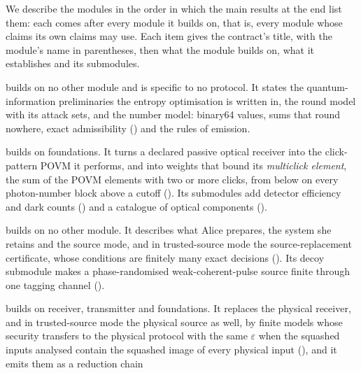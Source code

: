 We describe the modules in the order in which the main results at the end
list them: each comes after every module it builds on, that is, every module
whose claims its own claims may use. Each item gives the contract's title,
with the module's name in parentheses, then what the module builds on, what
it establishes and its submodules.

\begin{description}[leftmargin=0pt,itemsep=3pt]
\item[Foundations: quantum-information preliminaries, number model, exact
  admissibility and emission (foundations)] builds on no other module
  and is specific to no protocol. It states the quantum-information
  preliminaries the entropy optimisation is written in, the round model with
  its attack sets, and the number model: binary64 values, sums that round
  nowhere, exact admissibility ()
  and the rules of emission.
\item[Receiver POVM (receiver)] builds on foundations. It turns a
  declared passive optical receiver into the click-pattern POVM it performs,
  and into weights that bound its \emph{multiclick element}, the sum of the
  POVM elements with two or more clicks, from below on every photon-number
  block above a cutoff (). Its submodules add
  detector efficiency and dark counts
  () and a catalogue of
  optical components
  ().
\item[Transmitter source model (transmitter)] builds on no other
  module. It describes what Alice prepares, the system she retains and the
  source mode, and in trusted-source mode the source-replacement certificate,
  whose conditions are finitely many exact decisions
  (). Its decoy submodule makes
  a phase-randomised weak-coherent-pulse source finite through one tagging
  channel ().
\item[Proof reductions by squashing (reductions)] builds on receiver,
  transmitter and foundations. It replaces the physical receiver, and in
  trusted-source mode the physical source as well, by finite models whose
  security transfers to the physical protocol with the same $\varepsilon$
  when the squashed inputs analysed contain the squashed image of every
  physical input (), and it emits them as a reduction chain

\end{description}
